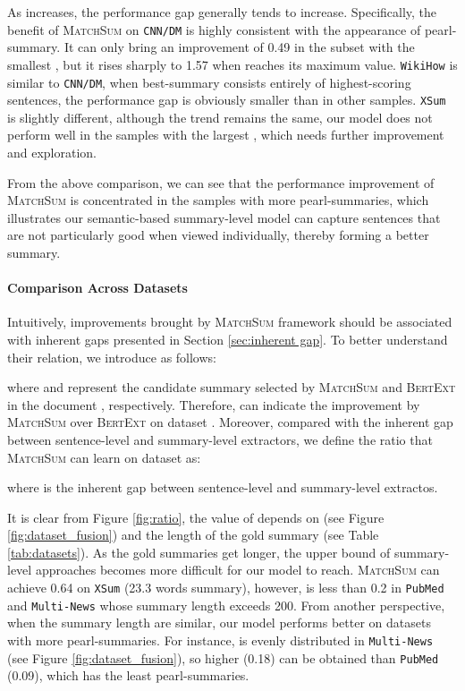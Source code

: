 \documentclass[11pt,a4paper]{article}
\begin{document}
As  increases, the performance gap generally tends to increase. Specifically, the benefit of \textsc{MatchSum} on \texttt{CNN/DM} is highly consistent with the appearance of pearl-summary. It can only bring an improvement of 0.49 in the subset with the smallest , but it rises sharply to 1.57 when  reaches its maximum value. \texttt{WikiHow} is similar to \texttt{CNN/DM}, when best-summary consists entirely of highest-scoring sentences, the performance gap is obviously smaller than in other samples. \texttt{XSum} is slightly different, although the trend remains the same, our model does not perform well in the samples with the largest , which needs further improvement and exploration.

From the above comparison, we can see that the performance improvement of \textsc{MatchSum} is concentrated in the samples with more pearl-summaries, which illustrates our semantic-based summary-level model can capture sentences that are not particularly good when viewed individually, thereby forming a better summary.

\paragraph{Comparison Across Datasets}
Intuitively, improvements brought by \textsc{MatchSum} framework should be associated with inherent gaps presented in Section \ref{sec:inherent gap}. To better understand their relation, we introduce  as follows:

where  and  represent the candidate summary selected by \textsc{MatchSum} and \textsc{BertExt} in the document , respectively. Therefore,  can indicate the improvement by \textsc{MatchSum} over \textsc{BertExt} on dataset . Moreover, compared with the inherent gap between sentence-level and summary-level extractors, we define the ratio that \textsc{MatchSum} can learn on dataset  as:

where  is the inherent gap between sentence-level and summary-level extractos.

It is clear from Figure \ref{fig:ratio}, the value of  depends on  (see Figure \ref{fig:dataset_fusion}) and the length of the gold summary (see Table \ref{tab:datasets}). As the gold summaries get longer, the upper bound of summary-level approaches becomes more difficult for our model to reach. \textsc{MatchSum} can achieve 0.64   on \texttt{XSum} (23.3 words summary), however,  is less than 0.2 in \texttt{PubMed} and \texttt{Multi-News} whose summary length exceeds 200. From another perspective, when the summary length are similar, our model performs better on datasets with more pearl-summaries. For instance,  is evenly distributed in \texttt{Multi-News} (see Figure \ref{fig:dataset_fusion}), so higher  (0.18) can be obtained than \texttt{PubMed} (0.09), which has the least pearl-summaries.
\end{document}
